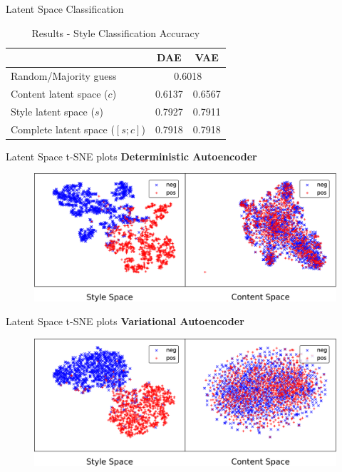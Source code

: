 \documentclass[aspectratio=169]{beamer}
\newcommand{\tabh}[1]{\multicolumn{1}{c|}{\textbf{#1}}}
\begin{document}
\begin{frame}{Latent Space Classification}
	\begin{table}[ht]
		\centering
		\begin{tabular}{| l || r | r |}
			\hline
			                                & \tabh{DAE}                  & \tabh{VAE} \\
			\hline \hline
			Random/Majority guess           & \multicolumn{2}{c|}{0.6018}              \\ \hline \hline
			Content latent space  ($c$)     & 0.6137                      & 0.6567     \\ \hline
			Style latent space ($s$)        & 0.7927                      & 0.7911     \\ \hline
			Complete latent space ($[s;c]$) & 0.7918                      & 0.7918     \\
			\hline
		\end{tabular}
		\caption{Results - Style Classification Accuracy}
		\label{tab:latent-space-classification}
	\end{table}
\end{frame}

\begin{frame}{Latent Space t-SNE plots}
	\centering
	\textbf{Deterministic Autoencoder}

	\begin{figure}[ht]
		\includegraphics[width=\textwidth]{images/dae-latent-spaces}
	\end{figure}
\end{frame}

\begin{frame}{Latent Space t-SNE plots}
	\centering
	\textbf{Variational Autoencoder}

	\begin{figure}[ht]
		\includegraphics[width=\textwidth]{images/vae-latent-spaces}
	\end{figure}
\end{frame}
\end{document}
